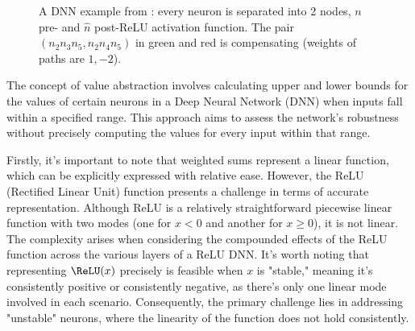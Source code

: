 \begin{figure}[t!]
	\caption{A DNN example from \cite{kpoly}: every neuron is separated into 2 nodes, $n$ pre- and $\hat{n}$ post-ReLU activation function. The pair $(n_2 n_3 n_5,n_2 n_4 n_5)$ in green and red is compensating (weights of paths are $1,-2$).}
	\label{fig1}
\end{figure}

The concept of value abstraction involves calculating upper and lower bounds for the values of certain neurons in a Deep Neural Network (DNN) when inputs fall within a specified range. This approach aims to assess the network's robustness without precisely computing the values for every input within that range.

Firstly, it's important to note that weighted sums represent a linear function, which can be explicitly expressed with relative ease. However, the ReLU (Rectified Linear Unit) function presents a challenge in terms of accurate representation. Although ReLU is a relatively straightforward piecewise linear function with two modes (one for $x<0$ and another for $x \geq 0$), it is not linear. The complexity arises when considering the compounded effects of the ReLU function across the various layers of a ReLU DNN. It's worth noting that representing $\ReLU(x)$ precisely is feasible when $x$ is "stable," meaning it's consistently positive or consistently negative, as there's only one linear mode involved in each scenario. Consequently, the primary challenge lies in addressing "unstable" neurons, where the linearity of the function does not hold consistently.


